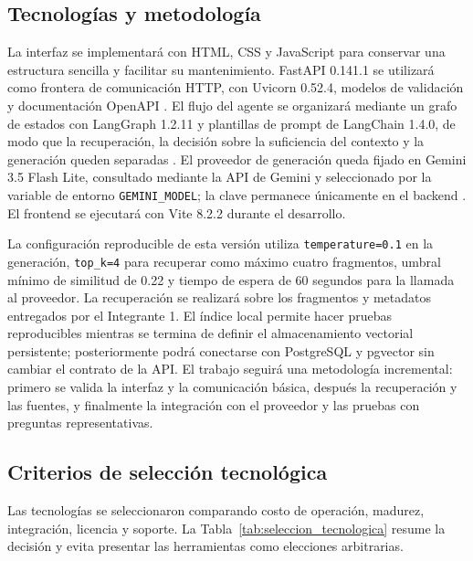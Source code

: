\subsection{Tecnologías y metodología}

La interfaz se implementará con HTML, CSS y JavaScript para conservar una estructura sencilla y facilitar su mantenimiento. FastAPI 0.141.1 se utilizará como frontera de comunicación HTTP, con Uvicorn 0.52.4, modelos de validación y documentación OpenAPI \cite{fastapiDocs}. El flujo del agente se organizará mediante un grafo de estados con LangGraph 1.2.11 y plantillas de prompt de LangChain 1.4.0, de modo que la recuperación, la decisión sobre la suficiencia del contexto y la generación queden separadas \cite{langchainDocs,langgraphDocs}. El proveedor de generación queda fijado en Gemini 3.5 Flash Lite, consultado mediante la API de Gemini y seleccionado por la variable de entorno \texttt{GEMINI\_MODEL}; la clave permanece únicamente en el backend \cite{googleGeminiApi}. El frontend se ejecutará con Vite 8.2.2 durante el desarrollo.

La configuración reproducible de esta versión utiliza \texttt{temperature=0.1} en la generación, \texttt{top\_k=4} para recuperar como máximo cuatro fragmentos, umbral mínimo de similitud de 0.22 y tiempo de espera de 60 segundos para la llamada al proveedor. La recuperación se realizará sobre los fragmentos y metadatos entregados por el Integrante 1. El índice local permite hacer pruebas reproducibles mientras se termina de definir el almacenamiento vectorial persistente; posteriormente podrá conectarse con PostgreSQL y pgvector sin cambiar el contrato de la API. El trabajo seguirá una metodología incremental: primero se valida la interfaz y la comunicación básica, después la recuperación y las fuentes, y finalmente la integración con el proveedor y las pruebas con preguntas representativas.

\subsection{Criterios de selección tecnológica}

Las tecnologías se seleccionaron comparando costo de operación, madurez, integración, licencia y soporte. La Tabla~\ref{tab:seleccion_tecnologica} resume la decisión y evita presentar las herramientas como elecciones arbitrarias.


